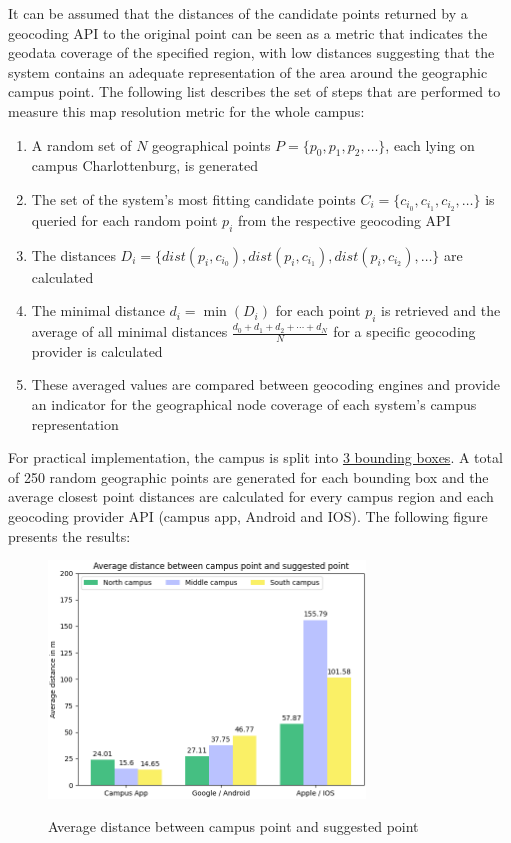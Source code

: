 It can be assumed that the distances of the candidate points returned by a geocoding API to the original point can be seen as a metric that indicates the geodata coverage of the specified region, with low distances suggesting that the system contains an adequate representation of the area around the geographic campus point. The following list describes the set of steps that are performed to measure this map resolution metric for the whole campus:

\newpage

\begin{enumerate}
    \item A random set of $N$ geographical points $P = \{p_{0}, p_{1}, p_{2}, \ldots\}$, each lying on campus Charlottenburg, is generated
    \item The set of the system's most fitting candidate points $C_{i} = \{c_{i_{0}}, c_{i_{1}}, c_{i_{2}}, \ldots\}$ is queried for each random point $p_{i}$ from the respective geocoding API
    \item The distances $D_{i} = \{dist(p_{i}, c_{i_{0}}), dist(p_{i}, c_{i_{1}}), dist(p_{i}, c_{i_{2}}), \ldots\}$ are calculated
    \item The minimal distance $d_{i} = \min(D_{i})$ for each point $p_{i}$ is retrieved and the average of all minimal distances $\frac{d_{0} + d_{1} + d_{2} + \cdots + d_{N}}{N}$ for a specific geocoding provider is calculated
    \item These averaged values are compared between geocoding engines and provide an indicator for the geographical node coverage of each system's campus representation
\end{enumerate}

\vspace{2mm}

For practical implementation, the campus is split into \hyperref[table:campus_regions]{3 bounding boxes}. A total of 250 random geographic points are generated for each bounding box and the average closest point distances are calculated for every campus region and each geocoding provider API (campus app, Android and IOS). The following figure presents the results:

\begin{figure}[H]
	\centering
	\includegraphics[width=0.75\textwidth]{images/average_campus_point_distance.png}\\
	\caption{Average distance between campus point and suggested point}
\end{figure}

